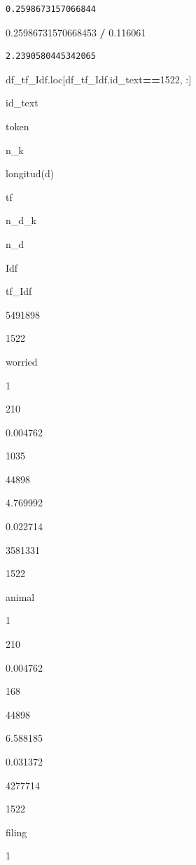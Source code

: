 \documentclass[
  11pt,
  a4paper,
]{article}
\newenvironment{Shaded}{\begin{snugshade}}{\end{snugshade}}
\newcommand{\DecValTok}[1]{\textcolor[rgb]{0.00,0.00,0.81}{#1}}
\newcommand{\FloatTok}[1]{\textcolor[rgb]{0.00,0.00,0.81}{#1}}
\newcommand{\NormalTok}[1]{#1}
\newcommand{\OperatorTok}[1]{\textcolor[rgb]{0.81,0.36,0.00}{\textbf{#1}}}
\begin{document}
\begin{verbatim}
0.2598673157066844
\end{verbatim}

\begin{Shaded}
\begin{Highlighting}[]
\FloatTok{0.25986731570668453} \OperatorTok{/} \FloatTok{0.116061}
\end{Highlighting}
\end{Shaded}

\begin{verbatim}
2.2390580445342065
\end{verbatim}

\begin{Shaded}
\begin{Highlighting}[]
\NormalTok{df\_tf\_Idf.loc[df\_tf\_Idf.id\_text}\OperatorTok{==}\DecValTok{1522}\NormalTok{, :]}
\end{Highlighting}
\end{Shaded}

id\_text

token

n\_k

longitud(d)

tf

n\_d\_k

n\_d

Idf

tf\_Idf

5491898

1522

worried

1

210

0.004762

1035

44898

4.769992

0.022714

3581331

1522

animal

1

210

0.004762

168

44898

6.588185

0.031372

4277714

1522

filing

1
\end{document}

